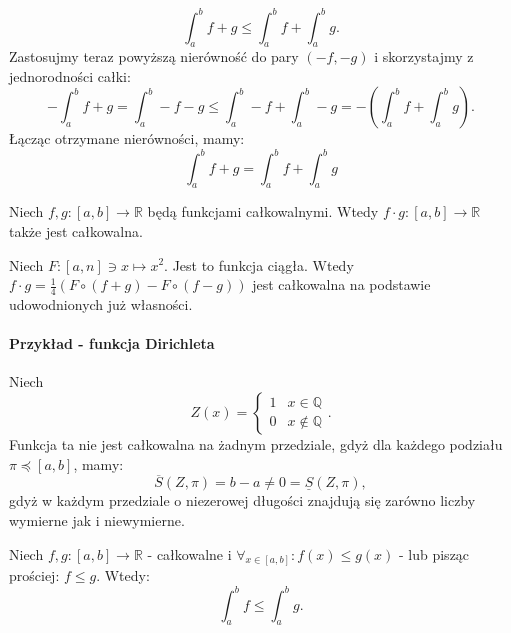 \documentclass{article}
\numberwithin{defi}{section}
\numberwithin{defi}{section}
\newcommand{\R}{\mathbb{R}}
\newcommand{\Q}{\mathbb{Q}}
\newcommand{\Sd}{\underline{S}}
\newcommand{\Sg}{\overline{S}}
\renewcommand{\leq}{\leqslant}
\begin{document}
\begin{dow}{}
\begin{equation*}
        \int_{a}^{b} f + g \leq \int_{a}^{b} f +  \int_{a}^{b} g.
    \end{equation*} Zastosujmy teraz powyższą nierówność do pary $(-f, -g)$ i skorzystajmy z jednorodności całki: \begin{equation}
        -\int_{a}^{b} f + g = \int_{a}^{b} -f - g \leq \int_{a}^{b} -f   + \int_{a}^{b} -g =-(\int_{a}^{b} f   + \int_{a}^{b} g).
    \end{equation} Łącząc otrzymane nierówności, mamy: \begin{equation*}
        \int_{a}^{b} f + g = \int_{a}^{b} f   + \int_{a}^{b} g
    \end{equation*}

\end{dow}



\begin{twier}{}
    Niech $f, g: [a, b] \to \R$ będą funkcjami całkowalnymi. Wtedy $f \cdot g: [a, b] \to \R$ także jest całkowalna.
\end{twier}

\begin{dow}{}
    Niech $F: [a, n] \ni x \mapsto x^2$. Jest to funkcja ciągła. Wtedy $ f \cdot g = \frac{1}{4}( F \circ (f + g) - F \circ (f - g))$ jest całkowalna na podstawie udowodnionych już własności. 
\end{dow}


\paragraph{Przykład - funkcja Dirichleta}
    Niech \begin{equation}
        Z (x) = \begin{cases}
            1 & x \in \Q \\
            0 & x \notin \Q
        \end{cases}.
    \end{equation} Funkcja ta nie jest całkowalna na żadnym przedziale, gdyż dla każdego podziału $\pi \preceq [a, b]$, mamy: \begin{equation}
        \Sg(Z, \pi ) = b - a \neq 0 = \Sd(Z, \pi),
    \end{equation} gdyż w każdym przedziale o niezerowej długości znajdują się zarówno liczby wymierne jak i niewymierne.

\begin{twier}{}
    Niech $f, g: [a, b]  \to \R$ - całkowalne i $\forall_{x \in [a, b]}: f(x) \leq g(x)$ - lub pisząc prościej: $f \leq g$. Wtedy: \begin{equation}
        \int_{a}^{b} f \leq \int_{a}^{b} g.
    \end{equation}
\end{twier}
\end{document}

